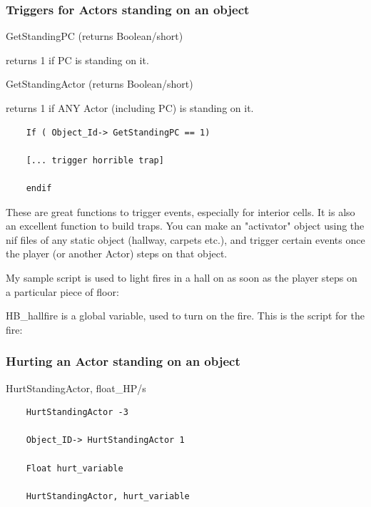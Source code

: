 \hypertarget{triggers-for-actors-standing-on-an-object}{%
\subsubsection{Triggers for Actors standing on an
object}\label{triggers-for-actors-standing-on-an-object}}

GetStandingPC (returns Boolean/short)

returns 1 if PC is standing on it.

GetStandingActor (returns Boolean/short)

returns 1 if ANY Actor (including PC) is standing on it.

\begin{lstlisting}
	If ( Object_Id-> GetStandingPC == 1)
	
	[... trigger horrible trap]
	
	endif
\end{lstlisting}

These are great functions to trigger events, especially for interior
cells. It is also an excellent function to build traps. You can make an
"activator" object using the nif files of any static object (hallway,
carpets etc.), and trigger certain events once the player (or another
Actor) steps on that object.

My sample script is used to light fires in a hall on as soon as the
player steps on a particular piece of floor:



HB\_hallfire is a global variable, used to turn on the fire. This is the
script for the fire:



\hypertarget{hurting-an-actor-standing-on-an-object}{%
\subsubsection{Hurting an Actor standing on an
object}\label{hurting-an-actor-standing-on-an-object}}

HurtStandingActor, float\_HP/s

\begin{lstlisting}
	HurtStandingActor -3
	
	Object_ID-> HurtStandingActor 1
	
	Float hurt_variable
	
	HurtStandingActor, hurt_variable
\end{lstlisting}


